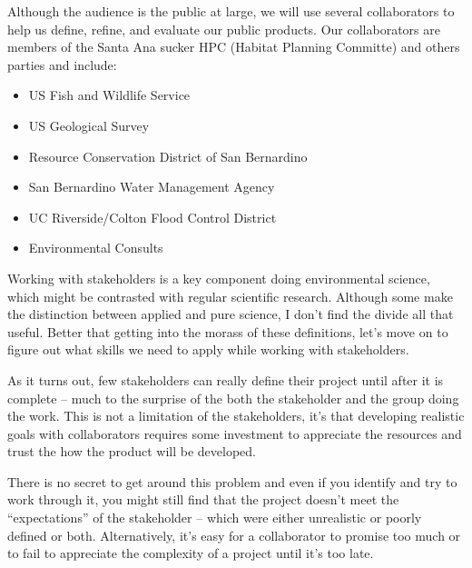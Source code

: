 \documentclass{tufte-handout}\usepackage[]{graphicx}\usepackage[]{color}
\begin{document}
Although the audience is the public at large, we will use several collaborators to help us define, refine, and evaluate our public products.  
Our collaborators are members of the Santa Ana sucker HPC (Habitat Planning Committe) and others parties and include: 

\begin{itemize}
  \item US Fish and Wildlife Service
  \item US Geological Survey
  \item Resource Conservation District of San Bernardino
  \item San Bernardino Water Management Agency
  \item UC Riverside/Colton Flood Control District
  \item Environmental Consults
\end{itemize}








Working with stakeholders is a key component doing environmental science, which might be contrasted with regular scientific research. Although some make the distinction between applied and pure science, I don't find the divide all that useful. Better that getting into the morass of these definitions, let's move on to figure out what skills we need to apply while working with stakeholders. 

As it turns out, few stakeholders can really define their project until after it is complete -- much to the surprise of the both the stakeholder and the group doing the work. This is not a limitation of the stakeholders, it's that developing realistic goals with collaborators requires some investment to appreciate the resources and trust the how the product will be developed. 

There is no secret to get around this problem and even if you identify and try to work through it, you might still find that the project doesn't meet the ``expectations'' of the stakeholder -- which were either unrealistic or poorly defined or both. Alternatively, it's easy for a collaborator to promise too much or to fail to appreciate the complexity of a project until it's too late. 
\end{document}
